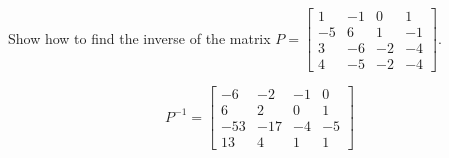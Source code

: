 
\begin{exerciseStatement}


Show how to find the inverse of the matrix \(P= \left[\begin{array}{cccc}
1 & -1 & 0 & 1 \\
-5 & 6 & 1 & -1 \\
3 & -6 & -2 & -4 \\
4 & -5 & -2 & -4
\end{array}\right] \).


\end{exerciseStatement}
    
\begin{exerciseAnswer} 
\[P^{-1}= \left[\begin{array}{cccc}
-6 & -2 & -1 & 0 \\
6 & 2 & 0 & 1 \\
-53 & -17 & -4 & -5 \\
13 & 4 & 1 & 1
\end{array}\right] \]
\end{exerciseAnswer}
    
